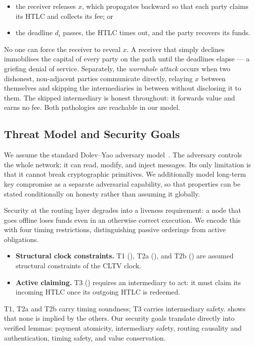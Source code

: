 \begin{itemize}
  \item the receiver releases $x$, which propagates backward so that each party
  claims its HTLC and collects its fee; or
  \item the deadline $d_i$ passes, the HTLC times out, and the party recovers
  its funds.
\end{itemize}

No one can force the receiver to reveal $x$. A receiver that simply declines
immobilises the capital of every party on the path until the deadlines elapse
--- a griefing denial of service. Separately, the \emph{wormhole attack} occurs
when two dishonest, non-adjacent parties communicate directly, relaying $x$
between themselves and skipping the intermediaries in between without
disclosing it to them. The skipped intermediary is honest throughout: it
forwards value and earns no fee. Both pathologies are reachable in our model.

\subsection{Threat Model and Security Goals}
\label{sec:threat}

We assume the standard Dolev--Yao adversary model~\cite{dolev1983security}. The
adversary controls the whole network: it can read, modify, and inject messages.
Its only limitation is that it cannot break cryptographic primitives. We
additionally model long-term key compromise as a separate adversarial
capability, so that properties can be stated conditionally on honesty rather
than assuming it globally.

Security at the routing layer degrades into a liveness requirement: a node that
goes offline loses funds even in an otherwise correct execution. We encode this
with four timing restrictions, distinguishing passive orderings from active
obligations.

\begin{itemize}
  \item \textbf{Structural clock constraints.} T1 (),
  T2a (), and T2b
  () are assumed structural
  constraints of the CLTV clock.
  \item \textbf{Active claiming.} T3 () requires an
  intermediary to act: it must claim its incoming HTLC once its outgoing HTLC
  is redeemed.
\end{itemize}

T1, T2a and T2b carry timing soundness; T3 carries intermediary safety.
 shows that none is implied by the others. Our security
goals translate directly into verified lemmas: payment atomicity, intermediary
safety, routing causality and authentication, timing safety, and value
conservation.
